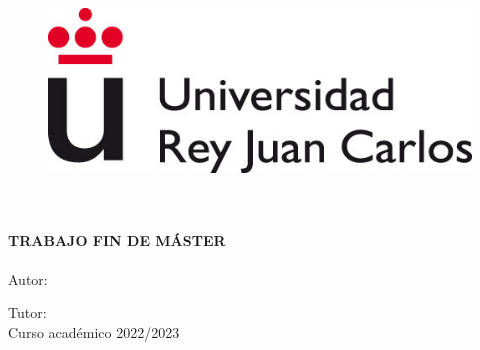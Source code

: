 \documentclass[
12pt, %
spanish, %
onehalfspacing, %
parskip, %
headsepline, %
chapterinoneline, %
]{MastersDoctoralThesis} %
\author{Sergio Merino Hernández} %
\begin{document}
\frontmatter %

\pagestyle{plain} %


\begin{titlepage}
\begin{center}

\vspace*{.01\textheight}
\begin{figure}
	\centering
	\includegraphics[scale=0.5]{Figures/urjc-logo}
\end{figure}
{\Large \MakeUppercase{\facname}}\\[1.5cm]
{\Large \MakeUppercase{\degreename}}\\[2.5cm] %
{\Large \textbf{TRABAJO FIN DE MÁSTER}}\\[3cm] %

{\Large \textbf{\MakeUppercase{\ttitle}}}\\[2cm] %

{\Large Autor: {\authorname}} %

{\Large Tutor: {\supname}}\\[1cm] %

{\large Curso académico 2022/2023}\\[4cm] %

\end{center}
\end{titlepage}
\end{document}
